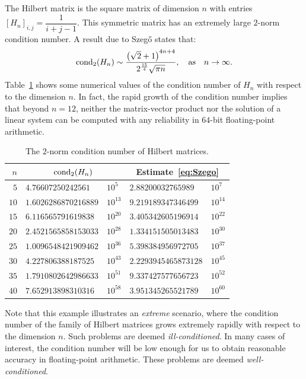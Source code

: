 \begin{example}
The Hilbert matrix is the square matrix of dimension $n$ with entries $[H_n]_{i,j} = \dfrac{1}{i+j-1}$. This symmetric matrix has an extremely large $2$-norm condition number. A result due to Szeg\H o states that:
\begin{equation}\label{eq:Szego}
\cond_2(H_n) \sim \dfrac{\pr(\sqrt{2}+1)^{4n+4}}{2^{\frac{15}{4}}\sqrt{\pi n}},\quad{\rm as}\quad n\to\infty.
\end{equation}
Table~\ref{table:Hilbert} shows some numerical values of the condition number of $H_n$ with respect to the dimension $n$. In fact, the rapid growth of the condition number implies that beyond $n=12$, neither the matrix-vector product nor the solution of a linear system can be computed with any reliability in $64$-bit floating-point arithmetic.
\begin{table}[htdp]
\caption{The $2$-norm condition number of Hilbert matrices.}
\begin{center}
\begin{tabular}{rl@{$\times$}ll@{$\times$}l}
\hline
$n$ & \multicolumn{2}{c}{$\operatorname{cond}_2(H_n)$} & \multicolumn{2}{c}{Estimate~\eqref{eq:Szego}}\\
\hline
$5$ & $4.76607250242561$ & $10^5$ & $2.88200032765989$ & $10^{7}$\\
$10$ & $1.6026286870216889$ & $10^{13}$ & $9.219189347346499$ & $10^{14}$\\
$15$ & $6.116565791619838$ & $10^{20}$ & $3.405342605196914$ & $10^{22}$\\
$20$ & $2.4521565858153033$ & $10^{28}$ & $1.334151505013483$ & $10^{30}$\\
$25$ & $1.0096548421909462$ & $10^{36}$ & $5.398384956972705$ & $10^{37}$\\
$30$ & $4.227806388187525$ & $10^{43}$ & $2.2293945465873128$ & $10^{45}$\\
$35$ & $1.7910802642986633$ & $10^{51}$ & $9.337427577656723$ & $10^{52}$\\
$40$ & $7.652913898310316$ & $10^{58}$ & $3.951345265521789$ & $10^{60}$\\
\hline
\end{tabular}
\end{center}
\label{table:Hilbert}
\end{table}%
\end{example}

Note that this example illustrates an {\em extreme} scenario, where the condition number of the family of Hilbert matrices grows extremely rapidly with respect to the dimension $n$. Such problems are deemed {\em ill-conditioned}. In many cases of interest, the condition number will be low enough for us to obtain reasonable accuracy in floating-point arithmetic. These problems are deemed {\em well-conditioned}.

